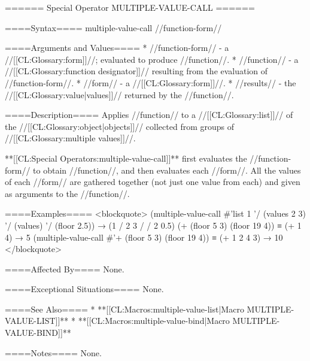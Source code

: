 ====== Special Operator MULTIPLE-VALUE-CALL ======

====Syntax====
\DefspecWithValues multiple-value-call {//function-form// } {}

====Arguments and Values====
  * //function-form// - a //[[CL:Glossary:form]]//; evaluated to produce //function//.
  * //function// - a //[[CL:Glossary:function designator]]// resulting from the evaluation of //function-form//.
  * //form// - a //[[CL:Glossary:form]]//.
  * //results// - the //[[CL:Glossary:value|values]]// returned by the //function//.

====Description====
Applies //function// to a //[[CL:Glossary:list]]// of the //[[CL:Glossary:object|objects]]// collected from groups of //[[CL:Glossary:multiple values]]//.

**[[CL:Special Operators:multiple-value-call]]** first evaluates the //function-form// to obtain //function//, and then evaluates each //form//. All the values of each //form// are gathered together (not just one value from each) and given as arguments to the //function//.

====Examples==== <blockquote> (multiple-value-call #'list 1 '/ (values 2 3) '/ (values) '/ (floor 2.5)) → (1 / 2 3 / / 2 0.5) (+ (floor 5 3) (floor 19 4)) ≡ (+ 1 4) → 5 (multiple-value-call #'+ (floor 5 3) (floor 19 4)) ≡ (+ 1 2 4 3) → 10 </blockquote>

====Affected By====
None.

====Exceptional Situations====
None.

====See Also====
  * **[[CL:Macros:multiple-value-list|Macro MULTIPLE-VALUE-LIST]]**
  * **[[CL:Macros:multiple-value-bind|Macro MULTIPLE-VALUE-BIND]]**

====Notes====
None.

